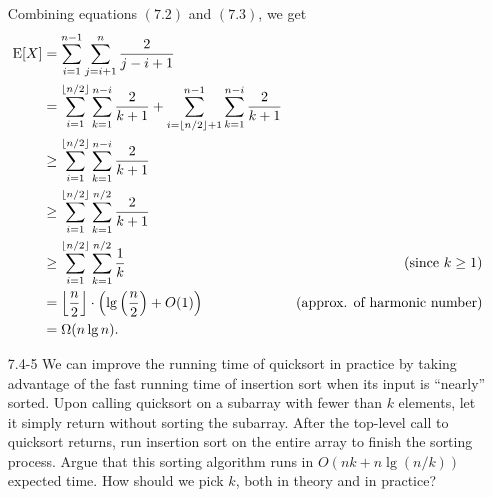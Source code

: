 \begin{enumerate}
\begin{framed}
Combining equations $(7.2)$ and $(7.3)$, we get
\begin{equation*}
\begin{aligned}
  \text{E}[X] &=   \sum_{i = 1}^{n - 1} \sum_{j = i + 1}^{n} \frac{2}{j - i + 1}\\
              &=   \sum_{i = 1}^{\lfloor n/2\rfloor} \sum_{k = 1}^{n - i} \frac{2}{k + 1} +
                   \sum_{i = \lfloor n/2\rfloor + 1}^{n - 1} \sum_{k = 1}^{n - i} \frac{2}{k + 1}\\
              &\ge \sum_{i = 1}^{\lfloor n/2\rfloor} \sum_{k = 1}^{n - i} \frac{2}{k + 1}\\
              &\ge \sum_{i = 1}^{\lfloor n/2\rfloor} \sum_{k = 1}^{n/2} \frac{2}{k + 1}\\
              &\ge \sum_{i = 1}^{\lfloor n/2\rfloor} \sum_{k = 1}^{n/2} \frac{1}{k} & \text{(since $k \ge 1$)}\\
              &= \Bigl\lfloor \frac{n}{2} \Bigr\rfloor \cdot \left(\lg \left( \frac{n}{2} \right) + O(1) \right) & \text{(approx. of harmonic number)}\\
              &= \Omega(n \lg n).
\end{aligned}
\end{equation*}
\end{framed}

\item[7.4{-}5]{We can improve the running time of quicksort in practice by
taking advantage of the fast running time of insertion sort when its input is
``nearly'' sorted. Upon calling quicksort on a subarray with fewer than
$k$ elements, let it simply return without sorting the subarray. After the
top-level call to quicksort returns, run insertion sort on the entire array
to finish the sorting process. Argue that this sorting algorithm runs in
$O(nk + n \lg(n/k))$ expected time. How should we pick $k$, both in theory and
in practice?}


\end{enumerate}

